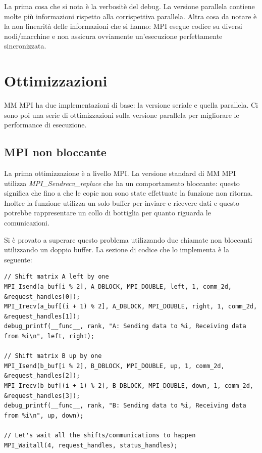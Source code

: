 La prima cosa che si nota \`{e} la verbosit\`{e} del debug. La versione parallela contiene molte pi\`{u} informazioni rispetto alla corrispettiva parallela. Altra cosa da notare \`{e} la non linearit\`{a} delle informazioni che si hanno: MPI esegue codice su diversi nodi/macchine e non assicura ovviamente un'esecuzione perfettamente sincronizzata.

\section{Ottimizzazioni}

MM MPI ha due implementazioni di base: la versione seriale e quella parallela. Ci sono poi una serie di ottimizzazioni sulla versione parallela per migliorare le performance di esecuzione.

\subsection{MPI non bloccante}

La prima ottimizzazione \`{e} a livello MPI. La versione standard di MM MPI utilizza \textit{MPI\_Sendrecv\_replace} che ha un comportamento bloccante: questo significa che fino a che le copie non sono state effettuate la funzione non ritorna. Inoltre la funzione utilizza un solo buffer per inviare e ricevere dati e questo potrebbe rappresentare un collo di bottiglia per quanto riguarda le comunicazioni.

Si \`{e} provato a superare questo problema utilizzando due chiamate non bloccanti utilizzando un doppio buffer. La sezione di codice che lo implementa \`{e} la seguente:

\begin{lstlisting}
// Shift matrix A left by one
MPI_Isend(a_buf[i % 2], A_DBLOCK, MPI_DOUBLE, left, 1, comm_2d, &request_handles[0]);
MPI_Irecv(a_buf[(i + 1) % 2], A_DBLOCK, MPI_DOUBLE, right, 1, comm_2d, &request_handles[1]);
debug_printf(__func__, rank, "A: Sending data to %i, Receiving data from %i\n", left, right);

// Shift matrix B up by one
MPI_Isend(b_buf[i % 2], B_DBLOCK, MPI_DOUBLE, up, 1, comm_2d, &request_handles[2]);
MPI_Irecv(b_buf[(i + 1) % 2], B_DBLOCK, MPI_DOUBLE, down, 1, comm_2d, &request_handles[3]);
debug_printf(__func__, rank, "B: Sending data to %i, Receiving data from %i\n", up, down);

// Let's wait all the shifts/communications to happen
MPI_Waitall(4, request_handles, status_handles);
\end{lstlisting}

